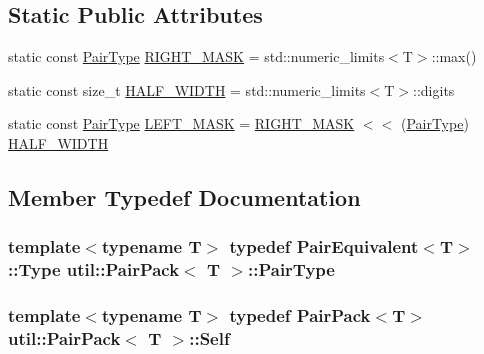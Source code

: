 \subsection*{Static Public Attributes}
\begin{DoxyCompactItemize}
\item 
static const \hyperlink{structutil_1_1PairPack_ad8f183acaed77988695003ec85c202c5}{Pair\-Type} \hyperlink{structutil_1_1PairPack_adac60467f205f05a29071c7e79d8cb2b}{R\-I\-G\-H\-T\-\_\-\-M\-A\-S\-K} = std\-::numeric\-\_\-limits$<$T$>$\-::max()
\item 
static const size\-\_\-t \hyperlink{structutil_1_1PairPack_a82b7f172ee421baa22504dcc01aa7263}{H\-A\-L\-F\-\_\-\-W\-I\-D\-T\-H} = std\-::numeric\-\_\-limits$<$T$>$\-::digits
\item 
static const \hyperlink{structutil_1_1PairPack_ad8f183acaed77988695003ec85c202c5}{Pair\-Type} \hyperlink{structutil_1_1PairPack_a87a1f72957290f5c965d55474a359d1a}{L\-E\-F\-T\-\_\-\-M\-A\-S\-K} = \hyperlink{structutil_1_1PairPack_adac60467f205f05a29071c7e79d8cb2b}{R\-I\-G\-H\-T\-\_\-\-M\-A\-S\-K} $<$$<$ (\hyperlink{structutil_1_1PairPack_ad8f183acaed77988695003ec85c202c5}{Pair\-Type}) \hyperlink{structutil_1_1PairPack_a82b7f172ee421baa22504dcc01aa7263}{H\-A\-L\-F\-\_\-\-W\-I\-D\-T\-H}
\end{DoxyCompactItemize}


\subsection{Member Typedef Documentation}
\hypertarget{structutil_1_1PairPack_ad8f183acaed77988695003ec85c202c5}{
\subsubsection[{Pair\-Type}]{\setlength{\rightskip}{0pt plus 5cm}template$<$typename T$>$ typedef {\bf Pair\-Equivalent}$<$T$>$\-::Type {\bf util\-::\-Pair\-Pack}$<$ T $>$\-::{\bf Pair\-Type}}}\label{structutil_1_1PairPack_ad8f183acaed77988695003ec85c202c5}
\hypertarget{structutil_1_1PairPack_aa2dfda083e6b23cdf79a5a3fe31da966}{
\subsubsection[{Self}]{\setlength{\rightskip}{0pt plus 5cm}template$<$typename T$>$ typedef {\bf Pair\-Pack}$<$T$>$ {\bf util\-::\-Pair\-Pack}$<$ T $>$\-::{\bf Self}}}\label{structutil_1_1PairPack_aa2dfda083e6b23cdf79a5a3fe31da966}


